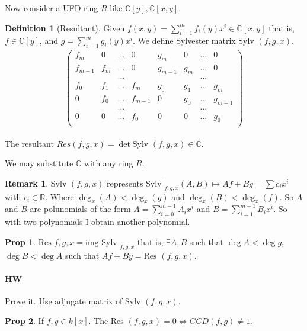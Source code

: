 \documentclass{article}
\theoremstyle{definition}
\newtheorem*{obs}{Remark}
\newtheorem*{prop}{Prop}
\newtheorem*{defn}{Definition}
\newcommand{\R}{\mathbb{R}}
\newcommand{\C}{\mathbb{C}}
\newcommand{\Res}{\text{Res }}
\newcommand{\img}{\text{img }}
\newcommand{\Sylv}{\text{Sylv }}
\begin{document}
Now consider a UFD ring $R$ like $\C[y],\C[x,y]$.
\begin{defn}[Resultant]
	Given $f(x,y)=\sum_{i=1}^m f_i(y)x^i \in\C[x,y]$ that is, $f\in\C[y]$, and $g=\sum_{i=1}^m g_i(y)x^i$. We define Sylvester matrix $\text{Sylv }(f,g,x)$.\\
	\begin{align*}
		\begin{pmatrix}f_m&0&...&0&g_m&0&...&0\\ 
			f_{m-1}&f_{m}&...&0&g_{m-1}&g_{m}&...&0\\
      &&...&&&&...&\\
			f_0 & f_1&...&f_m&g_0 & g_1&...&g_m\\
			0&f_0&...&f_{m-1}&0&g_0&...&g_{m-1}\\
         &&...&&&&...&\\
   			0&0&...&f_0&0&0&...&g_0\\
		\end{pmatrix}
	\end{align*}\par
	The resultant $Res(f,g,x)=\det \text{Sylv }(f,g,x)\in \C$.
\end{defn}
We may substitute $\C$ with any ring $R$.
\begin{obs}
	$\text{Sylv }(f,g,x)$ represents $\bar{\text{Sylv }_{f,g,x}}(A,B)\mapsto Af+Bg=\sum c_ix^i$ with $c_i\in\R$. Where $\deg_x(A)<\deg_x(g)$ and $\deg_x(B)<\deg_x(f)$. So $A$ and $B$ are polunomials of the form $A=\sum_{i=0}^{m-1}A_ix^i$ and $B=\sum_{i=1}^{m-1}B_ix^i$.  So with two polynomials I obtain another polynomial.
\end{obs}
\begin{prop}
	$\Res{f,g,x}=\img \Sylv _{f,g,x}$ that is, $\exists A,B$ such that $\deg A<\deg g$, $\deg B<\deg A$ such that $Af+By=\Res (f,g,x)$.
\end{prop}
\paragraph{HW} Prove it. Use adjugate matrix of $\Sylv(f,g,x)$.
\begin{prop}
	If $f,g\in k[x]$. The $\Res (f,g,x)=0\iff GCD(f,g)\neq1$.
\end{prop}
\end{document}
